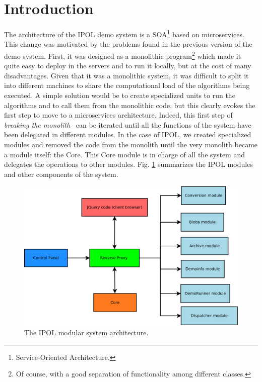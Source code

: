 \section{Introduction}
The architecture of the IPOL demo system is a SOA\footnote{Service-Oriented Architecture.} based on microservices. This change was motivated by the problems found in the previous version of the demo system. First, it was designed as a monolithic program\footnote{Of course, with a good separation of functionality among different classes.} which made it quite easy to deploy in the servers and to run it locally, but at the cost of many disadvantages.
%
Given that it was a monolithic system, it was difficult to split it into different machines to share the computational load of the algorithms being executed. A simple solution would be to create specialized units to run the algorithms and to call them from the monolithic code, but this clearly evokes the first step to move to a microservices architecture. Indeed, this first step of \emph{breaking the monolith}~\cite{neuman2015building} can be iterated until all the functions of the system have been delegated in different modules. In the case of IPOL, we created specialized modules and removed the code from the monolith until the very monolith became a module itself: the Core. This Core module is in charge of all the system and delegates the operations to other modules. Fig. \ref{fig:architecture} summarizes the IPOL modules and other components of the system.

\begin{figure}[!ht]
\centering
\includegraphics[width=0.8\linewidth]{architecture/images/architecture.pdf}
\caption{The IPOL modular system architecture.} 
\label{fig:architecture}
\end{figure}

